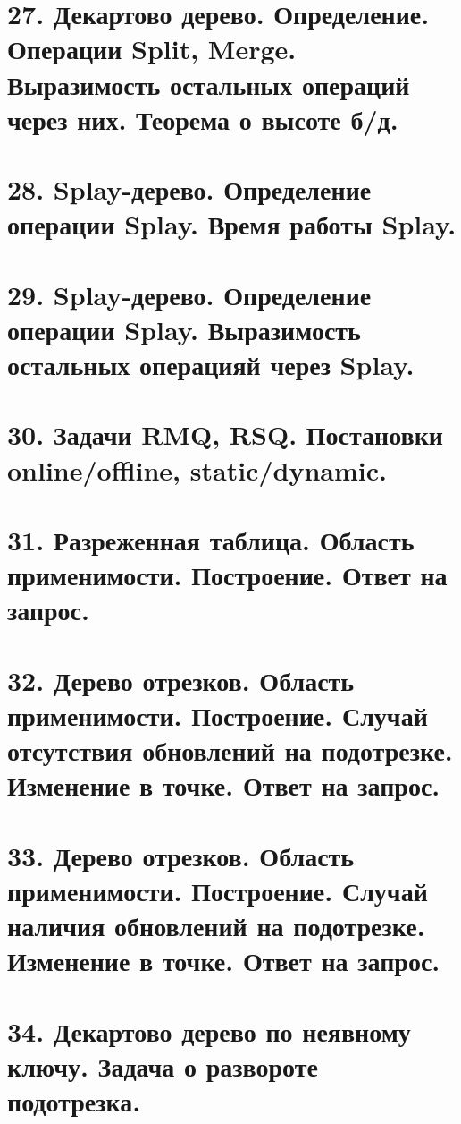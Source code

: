 \section{27. Декартово дерево. Определение. Операции Split, Merge. Выразимость остальных операций
через них. Теорема о высоте б/д.}


\section{28. Splay-дерево. Определение операции Splay. Время работы Splay.}


\section{29. Splay-дерево. Определение операции Splay. Выразимость остальных операцияй через Splay.}


\section{30. Задачи RMQ, RSQ. Постановки online/offline, static/dynamic.}


\hypertarget{sparse table}{}
\section{31. Разреженная таблица. Область применимости. Построение. Ответ на запрос.}


\hypertarget{segtree}{}
\section{32. Дерево отрезков. Область применимости. Построение. Случай отсутствия обновлений на подотрезке. Изменение в точке. Ответ на запрос.}


\section{33. Дерево отрезков. Область применимости. Построение. Случай наличия обновлений на подотрезке. Изменение в точке. Ответ на запрос.}


\section{34. Декартово дерево по неявному ключу. Задача о развороте подотрезка.}


